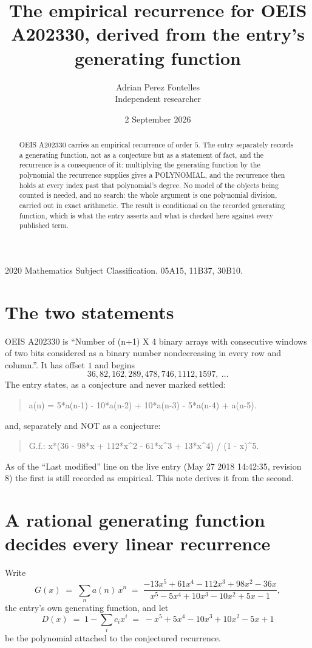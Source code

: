 \documentclass[11pt,a4paper]{article}
\title{The empirical recurrence for OEIS A202330, derived from the entry's generating function}
\author{Adrian Perez Fontelles\\ \small Independent researcher}
\date{2 September 2026}
\theoremstyle{plain}
\theoremstyle{definition}
\begin{document}
\maketitle

\begin{abstract}
OEIS A202330 carries an empirical recurrence of order $5$. The entry separately records a
generating function, not as a conjecture but as a statement of fact, and the recurrence is a
consequence of it: multiplying the generating function by the polynomial the recurrence
supplies gives a POLYNOMIAL, and the recurrence then holds at every index past that
polynomial's degree. No model of the objects being counted is needed, and no search: the
whole argument is one polynomial division, carried out in exact arithmetic. The result is
conditional on the recorded generating function, which is what the entry asserts and what is
checked here against every published term.
\end{abstract}

\noindent\small 2020 Mathematics Subject Classification. 05A15, 11B37, 30B10.\normalsize

\section{The two statements}

OEIS A202330 is ``Number of (n+1) X 4 binary arrays with consecutive windows of two bits considered as a binary number nondecreasing in every row and column.''. It has offset $1$ and begins
\[
36, 82, 162, 289, 478, 746, 1112, 1597,\ \dots
\]
The entry states, as a conjecture and never marked settled:
\begin{quote}
a(n) = 5*a(n-1) - 10*a(n-2) + 10*a(n-3) - 5*a(n-4) + a(n-5).
\end{quote}
and, separately and NOT as a conjecture:
\begin{quote}
G.f.: x*(36 - 98*x + 112*x\^{}2 - 61*x\^{}3 + 13*x\^{}4) / (1 - x)\^{}5.
\end{quote}
As of the ``Last modified'' line on the live entry (May 27 2018 14:42:35, revision 8) the first is still
recorded as empirical. This note derives it from the second.

\section{A rational generating function decides every linear recurrence}

Write
\[
G(x)\;=\;\sum_{n}a(n)\,x^{n}\;=\;\frac{- 13 x^{5} + 61 x^{4} - 112 x^{3} + 98 x^{2} - 36 x}{x^{5} - 5 x^{4} + 10 x^{3} - 10 x^{2} + 5 x - 1},
\]
the entry's own generating function, and let
\[
D(x)\;=\;1-\sum_i c_i x^{i}\;=\;- x^{5} + 5 x^{4} - 10 x^{3} + 10 x^{2} - 5 x + 1
\]
be the polynomial attached to the conjectured recurrence.
\end{document}
